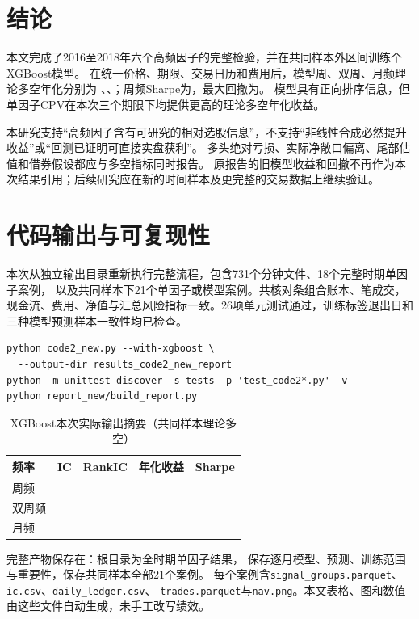 \documentclass[UTF8,zihao=-4,fontset=fandol]{ctexart}
\begin{document}
\section{结论}
本文完成了2016至2018年六个高频因子的完整检验，并在共同样本外区间训练\ModelsCount 个XGBoost模型。
在统一价格、期限、交易日历和费用后，模型周、双周、月频理论多空年化分别为
\ModelWeekReturn、\ModelBiweekReturn、\ModelMonthReturn；周频Sharpe为\ModelWeekSharpe，最大回撤为\ModelWeekDD。
模型具有正向排序信息，但单因子CPV在本次三个期限下均提供更高的理论多空年化收益。

本研究支持“高频因子含有可研究的相对选股信息”，不支持“非线性合成必然提升收益”或“回测已证明可直接实盘获利”。
多头绝对亏损、实际净敞口偏离、尾部估值和借券假设都应与多空指标同时报告。
原报告的旧模型收益和回撤不再作为本次结果引用；后续研究应在新的时间样本及更完整的交易数据上继续验证。

\clearpage
\section{代码输出与可复现性}
本次从独立输出目录重新执行完整流程，包含731个分钟文件、18个完整时期单因子案例，
以及共同样本下21个单因子或模型案例。共核对\AllSeries 条组合账本、\TradesCount 笔成交，
现金流、费用、净值与汇总风险指标一致。26项单元测试通过，训练标签退出日和三种模型预测样本一致性均已检查。

\begin{Verbatim}[fontsize=\small,frame=single,breaklines=true]
python code2_new.py --with-xgboost \
  --output-dir results_code2_new_report
python -m unittest discover -s tests -p 'test_code2*.py' -v
python report_new/build_report.py
\end{Verbatim}

\begin{table}[H]\centering\small
\caption{XGBoost本次实际输出摘要（共同样本理论多空）}
\begin{tabular}{lrrrr}\toprule
频率 & IC & RankIC & 年化收益 & Sharpe\\\midrule
周频 & \ModelWeekIC & \ModelWeekRank & \ModelWeekReturn & \ModelWeekSharpe\\
双周频 & \ModelBiweekIC & \ModelBiweekRank & \ModelBiweekReturn & \ModelBiweekSharpe\\
月频 & \ModelMonthIC & \ModelMonthRank & \ModelMonthReturn & \ModelMonthSharpe\\\bottomrule
\end{tabular}\end{table}

完整产物保存在：根目录为全时期单因子结果，
保存逐月模型、预测、训练范围与重要性，保存共同样本全部21个案例。
每个案例含\texttt{signal\_groups.parquet}、\texttt{ic.csv}、\texttt{daily\_ledger.csv}、
\texttt{trades.parquet}与\texttt{nav.png}。本文表格、图和数值由这些文件自动生成，未手工改写绩效。
\end{document}
